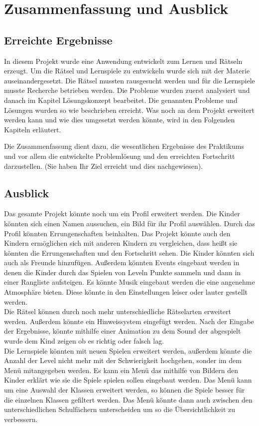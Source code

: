 \chapter{Zusammenfassung und Ausblick}
\label{cha:zusammenfassung}

\section{Erreichte Ergebnisse}
\label{sec:ergebnisse}

In diesem Projekt wurde eine Anwendung entwickelt zum Lernen und Rätseln erzeugt. Um die Rätsel und Lernspiele zu entwickeln wurde sich mit der Materie auseinandergesetzt. Die Rätsel mussten rausgesucht werden und für die Lernspiele musste Recherche betrieben werden. Die Probleme wurden zuerst analysiert und danach im Kapitel Lösungskonzept bearbeitet. Die genannten Probleme und Lösungen wurden so wie beschrieben erreicht. Was noch an dem Projekt erweitert werden kann und wie dies umgesetzt werden könnte, wird in den Folgenden Kapiteln erläutert.

Die Zusammenfassung dient dazu, die wesentlichen Ergebnisse des
Praktikums und vor allem die entwickelte Problemlösung und den
erreichten Fortschritt darzustellen. (Sie haben Ihr Ziel erreicht und
dies nachgewiesen).

\section{Ausblick}
\label{sec:ausblick}

Das gesamte Projekt könnte noch um ein Profil erweitert werden. Die Kinder könnten sich einen Namen aussuchen, ein Bild für ihr Profil auswählen. Durch das Profil könnten Errungenschaften beinhalten. Das Projekt könnte auch den Kindern ermöglichen sich mit anderen Kindern zu vergleichen, dass heißt sie könnten die Errungenschaften und den Fortschritt sehen. Die Kinder könnten sich auch als Freunde hinzufügen. Außerdem könnten Events eingebaut werden in denen die Kinder durch das Spielen von Leveln Punkte sammeln und dann in einer Rangliste aufsteigen. Es könnte Musik eingebaut werden die eine angenehme Atmosphäre bieten. Diese könnte in den Einstellungen leiser oder lauter gestellt werden. \\
Die Rätsel können durch noch mehr unterschiedliche Rätselarten erweitert werden. Außerdem könnte ein Hinweissystem eingefügt werden. Nach der Eingabe der Ergebnisse, könnte mithilfe einer Animation zu dem Sound der abgespielt wurde dem Kind zeigen ob es richtig oder falsch lag.\\
Die Lernspiele könnten mit neuen Spielen erweitert werden, außerdem könnte die Anzahl der Level nicht mehr mit der Schwierigkeit hochgehen, sonder im dem Menü mitangegeben werden. Es kann ein Menü das mithilfe von Bildern den Kinder erklärt wie sie die Spiele spielen sollen eingebaut werden. Das Menü kann um eine Auswahl der Klassen erweitert werden, so können die Spiele besser für die einzelnen Klassen gefiltert werden. Das Menü könnte dann auch zwischen den unterschiedlichen Schulfächern unterscheiden um so die Übersichtlichkeit zu verbessern.\\


